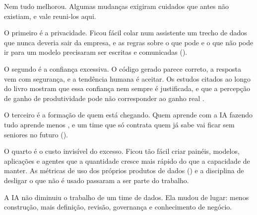 Nem tudo melhorou. Algumas mudanças exigiram cuidados que antes não existiam, e vale
reuni-los aqui.

O primeiro é a privacidade. Ficou fácil colar num assistente um trecho de dados que nunca
deveria sair da empresa, e as regras sobre o que pode e o que não pode ir para um modelo
precisaram ser escritas e comunicadas ().

O segundo é a confiança excessiva. O código gerado parece correto, a resposta vem com
segurança, e a tendência humana é aceitar. Os estudos citados ao longo do livro mostram que
essa confiança nem sempre é justificada, e que a percepção de ganho de produtividade pode não
corresponder ao ganho real \parencite{becker2025,perry2023}.

O terceiro é a formação de quem está chegando. Quem aprende com a IA fazendo tudo aprende menos
\parencite{shen2026}, e um time que só contrata quem já sabe vai ficar sem seniores no futuro
().

O quarto é o custo invisível do excesso. Ficou tão fácil criar painéis, modelos, aplicações e
agentes que a quantidade cresce mais rápido do que a capacidade de manter. As métricas de uso
dos próprios produtos de dados () e a disciplina de desligar o que não é
usado passaram a ser parte do trabalho.

\begin{destaque}
A IA não diminuiu o trabalho de um time de dados. Ela mudou de lugar: menos construção, mais
definição, revisão, governança e conhecimento de negócio.
\end{destaque}


\begin{leituras}
\end{leituras}
